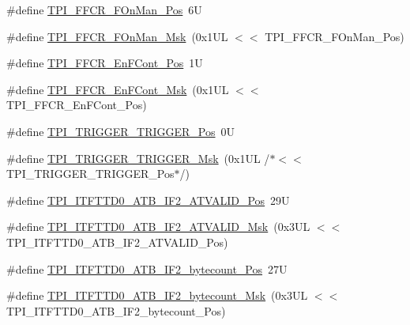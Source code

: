 \begin{DoxyCompactItemize}
\item 
\#define \mbox{\hyperlink{group___c_m_s_i_s___t_p_i_gac57b0b588a37a870573560bc6316cbcc}{T\+P\+I\+\_\+\+F\+F\+C\+R\+\_\+\+F\+On\+Man\+\_\+\+Pos}}~6U
\item 
\#define \mbox{\hyperlink{group___c_m_s_i_s___t_p_i_ga7aeb30af62d04e852a55c3bd64c1bd2c}{T\+P\+I\+\_\+\+F\+F\+C\+R\+\_\+\+F\+On\+Man\+\_\+\+Msk}}~(0x1\+U\+L $<$$<$ T\+P\+I\+\_\+\+F\+F\+C\+R\+\_\+\+F\+On\+Man\+\_\+\+Pos)
\item 
\#define \mbox{\hyperlink{group___c_m_s_i_s___t_p_i_ga99e58a0960b275a773b245e2b69b9a64}{T\+P\+I\+\_\+\+F\+F\+C\+R\+\_\+\+En\+F\+Cont\+\_\+\+Pos}}~1U
\item 
\#define \mbox{\hyperlink{group___c_m_s_i_s___t_p_i_ga27d1ecf2e0ff496df03457a2a97cb2c9}{T\+P\+I\+\_\+\+F\+F\+C\+R\+\_\+\+En\+F\+Cont\+\_\+\+Msk}}~(0x1\+U\+L $<$$<$ T\+P\+I\+\_\+\+F\+F\+C\+R\+\_\+\+En\+F\+Cont\+\_\+\+Pos)
\item 
\#define \mbox{\hyperlink{group___c_m_s_i_s___t_p_i_ga5517fa2ced64efbbd413720329c50b99}{T\+P\+I\+\_\+\+T\+R\+I\+G\+G\+E\+R\+\_\+\+T\+R\+I\+G\+G\+E\+R\+\_\+\+Pos}}~0U
\item 
\#define \mbox{\hyperlink{group___c_m_s_i_s___t_p_i_ga814227af2b2665a0687bb49345e21110}{T\+P\+I\+\_\+\+T\+R\+I\+G\+G\+E\+R\+\_\+\+T\+R\+I\+G\+G\+E\+R\+\_\+\+Msk}}~(0x1\+U\+L /$\ast$$<$$<$ T\+P\+I\+\_\+\+T\+R\+I\+G\+G\+E\+R\+\_\+\+T\+R\+I\+G\+G\+E\+R\+\_\+\+Pos$\ast$/)
\item 
\#define \mbox{\hyperlink{group___c_m_s_i_s___t_p_i_gab268401221645f4e0e1a82d1d6c2caee}{T\+P\+I\+\_\+\+I\+T\+F\+T\+T\+D0\+\_\+\+A\+T\+B\+\_\+\+I\+F2\+\_\+\+A\+T\+V\+A\+L\+I\+D\+\_\+\+Pos}}~29U
\item 
\#define \mbox{\hyperlink{group___c_m_s_i_s___t_p_i_gac6fc2d04903210afe2599482a72e0a25}{T\+P\+I\+\_\+\+I\+T\+F\+T\+T\+D0\+\_\+\+A\+T\+B\+\_\+\+I\+F2\+\_\+\+A\+T\+V\+A\+L\+I\+D\+\_\+\+Msk}}~(0x3\+U\+L $<$$<$ T\+P\+I\+\_\+\+I\+T\+F\+T\+T\+D0\+\_\+\+A\+T\+B\+\_\+\+I\+F2\+\_\+\+A\+T\+V\+A\+L\+I\+D\+\_\+\+Pos)
\item 
\#define \mbox{\hyperlink{group___c_m_s_i_s___t_p_i_gadaa8bfec760711c2d190d5fd124706fe}{T\+P\+I\+\_\+\+I\+T\+F\+T\+T\+D0\+\_\+\+A\+T\+B\+\_\+\+I\+F2\+\_\+bytecount\+\_\+\+Pos}}~27U
\item 
\#define \mbox{\hyperlink{group___c_m_s_i_s___t_p_i_ga8b342379b5d45d46459807859a8a6687}{T\+P\+I\+\_\+\+I\+T\+F\+T\+T\+D0\+\_\+\+A\+T\+B\+\_\+\+I\+F2\+\_\+bytecount\+\_\+\+Msk}}~(0x3\+U\+L $<$$<$ T\+P\+I\+\_\+\+I\+T\+F\+T\+T\+D0\+\_\+\+A\+T\+B\+\_\+\+I\+F2\+\_\+bytecount\+\_\+\+Pos)

\end{DoxyCompactItemize}
